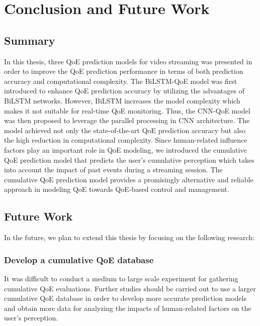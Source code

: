 \chapter{Conclusion and Future Work}
\label{ch:Conclusion}


\section{Summary}


In this thesis, three QoE prediction models for video streaming was presented in order to improve the QoE prediction performance in terms of both prediction accuracy and computational complexity.
The BiLSTM-QoE model was first introduced to enhance QoE prediction accuracy by utilizing the advantages of BiLSTM networks.
However, BiLSTM increases the model complexity which makes it not suitable for real-time QoE monitoring.
Thus, the CNN-QoE model was then proposed to leverage the parallel processing in CNN architecture.
The model achieved not only the state-of-the-art QoE prediction accuracy but also the high reduction in computational complexity.
Since human-related influence factors play an important role in QoE modeling, we introduced the cumulative QoE prediction model that predicts the user's cumulative perception which takes into account the impact of past events during a streaming session.
The cumulative QoE prediction model provides a promisingly alternative and reliable approach in modeling QoE towards QoE-based control and management.


\section{Future Work}

In the future, we plan to extend this thesis by focusing on the following research:

\subsection{Develop a cumulative QoE database}

It was difficult to conduct a medium to large scale experiment for gathering cumulative QoE evaluations.
Further studies should be carried out to use a larger cumulative QoE database in order to develop more accurate prediction models and obtain more data for analyzing the impacts of human-related factors on the user's perception.


